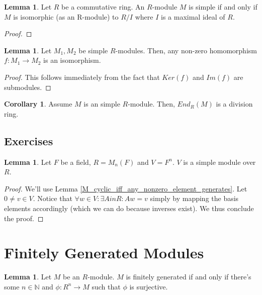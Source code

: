 \documentclass{article}
\theoremstyle{definition}
\newtheorem{lemma}[theorem]{Lemma}
\newtheorem{corollary}{Corollary}[theorem]
\newcommand{\N}{\mathbb{N}}
\begin{document}
\begin{lemma}\label{simple_modules_are_quotients_of_maximal_ideals}
    Let $R$ be a commutative ring. An $R$-module $M$ is simple if and only if $M$ is isomorphic (as an R-module) to $R/I$ where $I$ is a maximal ideal of $R$.
\end{lemma}
\begin{proof}
    
\end{proof}

\begin{lemma}
    Let $M_{1},M_{2}$ be simple $R$-modules. Then, any non-zero homomorphism $f: M_{1} \xrightarrow{} M_{2}$ is an isomorphism.
\end{lemma}
\begin{proof}
    This follows immediately from the fact that $Ker(f)$ and $Im(f)$ are submodules.
\end{proof}

\begin{corollary}
    Assume $M$ is an simple $R$-module. Then, $End_{R}(M)$ is a division ring.
\end{corollary}

\newpage

\subsection{Exercises}

\begin{lemma}
    Let $F$ be a field, $R = M_{n}(F)$ and $V=F^{n}$. $V$ is a simple module over 
    $R$.
\end{lemma}
\begin{proof}
    We'll use Lemma \ref{M_cyclic_iff_any_nonzero_element_generates}. Let $0 \neq v \in V$.
    Notice that $\forall w \in V: \exists A in R: Aw = v$ simply by mapping the basis elements
    accordingly (which we can do because inverses exist). We thus conclude the proof.
\end{proof}

\newpage

\section{Finitely Generated Modules}

\begin{lemma}
    Let $M$ be an $R$-module. $M$ is finitely generated if and only if there's some
    $n \in \N$ and $\phi: R^{n} \xrightarrow{} M$ such that $\phi$ is surjective.
\end{lemma}
\end{document}
